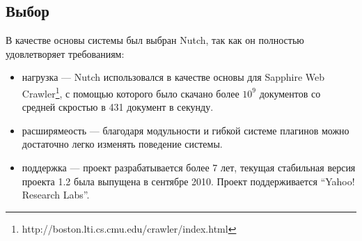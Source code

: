 \subsection{Выбор}
В качестве основы системы был выбран Nutch, так как он полностью удовлетворяет требованиям:
\begin{itemize}
 \item нагрузка --- Nutch использовался в качестве основы для Sapphire Web Crawler\footnote{http://boston.lti.cs.cmu.edu/crawler/index.html}, с помощью которого было скачано более $10^{9}$ документов со средней скростью в 431 документ в секунду.
 \item расширямеость --- благодаря модульности и гибкой системе плагинов можно достаточно легко изменять поведение системы.
 \item поддержка --- проект разрабатывается более 7 лет, текущая стабильная версия проекта 1.2 была выпущена в сентябре 2010. Проект поддерживается ``Yahoo! Research Labs''.
\end{itemize}

